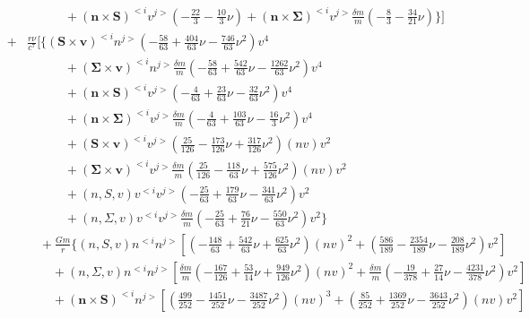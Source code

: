 {\begin{eqnarray}
&& \qquad\quad+ (\mathbf{n}\times\mathbf{S})^{<i} v^{j>}\left(-\frac{22}{3} -\frac{10}{3} \nu\right) 
+ (\mathbf{n}\times\mathbf{\Sigma})^{<i} v^{j>}\frac{\delta m}{m}\left(-\frac{8}{3} -\frac{34}{21} \nu\right)
\bigg\}\Bigg]\nonumber\\
&+&\frac{r\nu}{c^7}\Bigg[\bigg\{
(\mathbf{S}\times\mathbf{v})^{<i} n^{j>}\left(-\frac{58}{63} + \frac{404}{63} \nu -\frac{746}{63} \nu^2\right) v^{4}\nonumber \\ 
&&\qquad\quad + (\mathbf{\Sigma}\times\mathbf{v})^{<i} n^{j>}\frac{\delta m}{m}\left(-\frac{58}{63} + \frac{542}{63} \nu -\frac{1262}{63} \nu^2\right) v^{4} \nonumber \\ 
&&\qquad\quad + (\mathbf{n}\times\mathbf{S})^{<i} v^{j>}\left(-\frac{4}{63} + \frac{23}{63} \nu -\frac{32}{63} \nu^2\right) v^{4} \nonumber \\ 
&&\qquad\quad + (\mathbf{n}\times\mathbf{\Sigma})^{<i} v^{j>}\frac{\delta m}{m}\left(-\frac{4}{63} + \frac{103}{63} \nu -\frac{16}{3} \nu^2\right) v^{4} \nonumber \\ 
&&\qquad\quad + (\mathbf{S}\times\mathbf{v})^{<i} v^{j>}\left(\frac{25}{126} -\frac{173}{126} \nu + \frac{317}{126} \nu^2\right) (nv) v^{2} \nonumber \\ 
&&\qquad\quad + (\mathbf{\Sigma}\times\mathbf{v})^{<i} v^{j>}\frac{\delta m}{m}\left(\frac{25}{126} -\frac{118}{63} \nu + \frac{575}{126} \nu^2\right) (nv) v^{2} \nonumber \\ 
&&\qquad\quad + (n,S,v) v^{<i} v^{j>}\left(-\frac{25}{63} + \frac{179}{63} \nu -\frac{341}{63} \nu^2\right) v^{2} \nonumber \\ 
&&\qquad\quad + (n,\Sigma ,v) v^{<i} v^{j>}\frac{\delta m}{m}\left(-\frac{25}{63} + \frac{76}{21} \nu -\frac{550}{63} \nu^2\right) v^{2}\bigg\}\nonumber \\
 &&\quad+\frac{Gm}{r}\bigg\{
 (n,S,v) n^{<i} n^{j>}\left[\left(-\frac{148}{63} + \frac{542}{63} \nu + \frac{625}{63} \nu^2\right) (nv)^2+\left(\frac{586}{189} -\frac{2354}{189} \nu -\frac{208}{189} \nu^2\right) v^{2}\right] \nonumber \\ 
&&\qquad + (n,\Sigma ,v) n^{<i} n^{j>}\left[\frac{\delta m}{m}\left(-\frac{167}{126} + \frac{53}{14} \nu + \frac{949}{126} \nu^2\right) (nv)^2+\frac{\delta m}{m}\left(-\frac{19}{378} + \frac{27}{14} \nu -\frac{4231}{378} \nu^2\right) v^{2}\right] \nonumber \\ 
&&\qquad + (\mathbf{n}\times\mathbf{S})^{<i} n^{j>}\left[\left(\frac{499}{252} -\frac{1451}{252} \nu -\frac{3487}{252} \nu^2\right) (nv)^3+\left(\frac{85}{252} + \frac{1369}{252} \nu -\frac{3643}{252} \nu^2\right) (nv) v^{2}\right] \nonumber \\ 

\end{eqnarray}}
